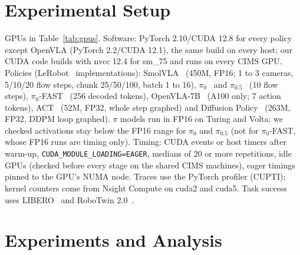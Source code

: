 \documentclass[10pt,twocolumn]{article}
\begin{document}
\section{Experimental Setup}
\begin{table}[t]\centering\small
{}
\caption{GPUs of the cross-GPU study. Bandwidth measured with our sweep (bench/calib). The
first three are CIMS machines. Also used: a GTX TITAN X (cuda4, C++ calibration only), a node
with two A100s (placement study) and an RTX PRO 6000 Blackwell (Empire AI, multi-policy
study).}\label{tab:gpus}
\end{table}
GPUs in Table~\ref{tab:gpus}. Software: PyTorch 2.10/CUDA 12.8 for every policy except OpenVLA
(PyTorch 2.2/CUDA 12.1), the same build on every host; our CUDA code builds with nvcc 12.4 for
sm\_75 and runs on every CIMS GPU. Policies (LeRobot~\cite{lerobot} implementations):
SmolVLA~\cite{smolvla} (450M, FP16; 1 to 3 cameras, 5/10/20 flow steps, chunk 25/50/100, batch
1 to 16), $\pi_0$~\cite{pi0} and $\pi_{0.5}$~\cite{pi05} (10 flow steps), $\pi_0$-FAST~\cite{fast}
(256 decoded tokens), OpenVLA-7B~\cite{openvla} (A100 only; 7 action tokens), ACT~\cite{act}
(52M, FP32, whole step graphed) and Diffusion Policy~\cite{diffusionpolicy} (263M, FP32, DDPM
loop graphed). $\pi$ models run in FP16 on Turing and Volta; we checked activations stay below
the FP16 range for $\pi_0$ and $\pi_{0.5}$ (not for $\pi_0$-FAST, whose FP16 runs are
timing only). Timing: CUDA events or host timers after warm-up,
\texttt{CUDA\_MODULE\_LOADING=EAGER}, medians of 20 or more repetitions, idle GPUs (checked
before every stage on the shared CIMS machines), eager timings pinned to the GPU's NUMA node.
Traces use the PyTorch profiler (CUPTI); kernel counters come from Nsight Compute on cuda2 and
cuda5. Task success uses LIBERO~\cite{libero} and RoboTwin 2.0~\cite{robotwin}.

\section{Experiments and Analysis}
\end{document}
